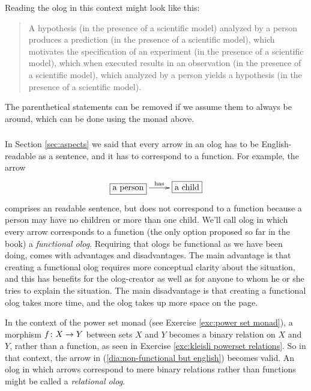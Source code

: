 \begin{example}
Reading the olog in this context might look like this:

\begin{quote}
A hypothesis (in the presence of a scientific model) analyzed by a person produces a prediction (in the presence of a scientific model), which motivates the specification of an experiment (in the presence of a scientific model), which when executed results in an observation (in the presence of a scientific model), which analyzed by a person yields a hypothesis (in the presence of a scientific model).
\end{quote}

The parenthetical statements can be removed if we assume them to always be around, which can be done using the monad above.

\end{example}


\subsubsection{}\label{sec:relaxing ologs}

In Section \ref{sec:aspects} we said that every arrow in an olog has to be English-readable as a sentence, and it has to correspond to a function. For example, the arrow 
\begin{align}\label{dia:non-functional but english}
\xymatrix{\fbox{a person}\LA{r}{has}&\fbox{a child}}
\end{align}
comprises an readable sentence, but does not correspond to a function because a person may have no children or more than one child. 
We'll call olog in which every arrow corresponds to a function (the only option proposed so far in the book) a {\em functional olog}. Requiring that ologs be functional as we have been doing, comes with advantages and disadvantages. The main advantage is that creating a functional olog requires more conceptual clarity about the situation, and this has benefits for the olog-creator as well as for anyone to whom he or she tries to explain the situation. The main disadvantage is that creating a functional olog takes more time, and the olog takes up more space on the page.

In the context of the power set monad (see Exercise \ref{exc:power set monad}), a morphism $f\colon X\rightarrow Y$ between sets $X$ and $Y$ becomes a binary relation on $X$ and $Y$, rather than a function, as seen in Exercise \ref{exc:kleisli powerset relations}. So in that context, the arrow in (\ref{dia:non-functional but english}) becomes valid. An olog in which arrows correspond to mere binary relations rather than functions might be called a {\em relational olog}.

